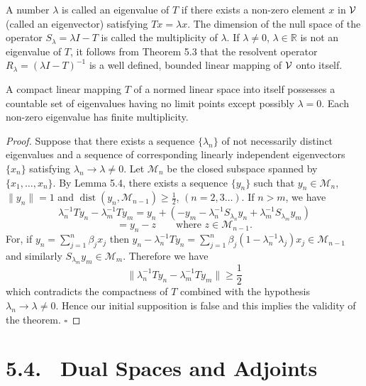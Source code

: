 \begin{definition}\label{gt.def5.3.eigenvalue}
A number $\lambda$ is called an eigenvalue of $T$ if there exists a non-zero element $x$ in $\mathcal{V}$ (called an eigenvector) satisfying $Tx=\lambda x$. The dimension of the null space of the operator $S_\lambda=\lambda I-T$ is called the multiplicity of $\lambda$. If $\lambda\neq 0$, $\lambda\in \mathbb{R}$ is not an eigenvalue of $T$, it follows from Theorem 5.3 that the resolvent operator $R_\lambda=(\lambda I-T)^{-1}$ is a well defined, bounded linear mapping of $\mathcal{V}$ onto itself.
\end{definition}

\begin{theorem}\label{gt.thm5.5}
A compact linear mapping $T$ of a normed linear space into itself possesses a countable set of eigenvalues having no limit points except possibly $\lambda=0$. Each non-zero eigenvalue has finite multiplicity.
\end{theorem}

\begin{proof}
Suppose that there exists a sequence $\{\lambda_n\}$ of not necessarily distinct eigenvalues and a sequence of corresponding linearly independent eigenvectors $\{x_n\}$ satisfying $\lambda_n\to \lambda\neq 0$. Let $\mathcal M_n$ be the closed subspace spanned by $\{x_1,\ldots,x_n\}$. By Lemma 5.4, there exists a sequence $\{y_n\}$ such that $y_n\in\mathcal M_n$, $\|y_n\|=1$ and $\operatorname{dist}(y_n,\mathcal M_{n-1})\geq \frac12$, $(n=2,3\ldots)$. If $n>m$, we have
\[
\lambda_n^{-1}Ty_n-\lambda_m^{-1}Ty_m
=y_n+(-y_m-\lambda_n^{-1}S_{\lambda_n}y_n+\lambda_m^{-1}S_{\lambda_m}y_m)
\]
\[
=y_n-z \qquad \text{where } z\in\mathcal M_{n-1}.
\]
For, if $y_n=\sum_{j=1}^{n}\beta_jx_j$ then $y_n-\lambda_n^{-1}Ty_n=\sum_{j=1}^{n}\beta_j(1-\lambda_n^{-1}\lambda_j)x_j\in\mathcal M_{n-1}$ and similarly $S_{\lambda_m}y_m\in\mathcal M_m$. Therefore we have
\[
\bigl\|\lambda_n^{-1}Ty_n-\lambda_m^{-1}Ty_m\bigr\|\geq \frac12
\]
which contradicts the compactness of $T$ combined with the hypothesis $\lambda_n\to\lambda\neq 0$.
Hence our initial supposition is false and this implies the validity of the theorem. $\square$
\end{proof}

\section*{5.4. \ Dual Spaces and Adjoints}

